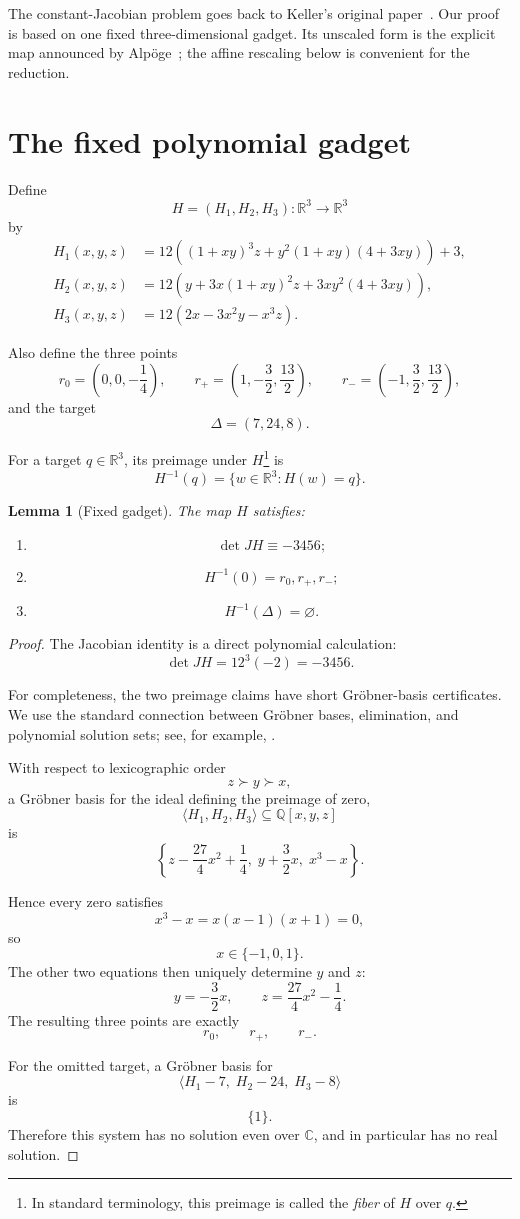 \documentclass[11pt]{article}
\newtheorem{lemma}[theorem]{Lemma}
\newcommand{\R}{\mathbb{R}}
\begin{document}
The constant-Jacobian problem goes back to Keller's original
paper~\cite{Keller1939}.  Our proof is based on one fixed three-dimensional
gadget.  Its unscaled form is the explicit map announced by
Alpöge~\cite{Alpoge2026}; the affine rescaling below is convenient for the
reduction.

\section{The fixed polynomial gadget}

Define
\[
H=(H_1,H_2,H_3):\R^3\longrightarrow\R^3
\]
by
\begin{align}
H_1(x,y,z)
&=
12\left(
(1+xy)^3z
+
y^2(1+xy)(4+3xy)
\right)
+3,
\\
H_2(x,y,z)
&=
12\left(
y
+
3x(1+xy)^2z
+
3xy^2(4+3xy)
\right),
\\
H_3(x,y,z)
&=
12\left(
2x-3x^2y-x^3z
\right).
\end{align}

Also define the three points
\[
r_0=
\left(0,0,-\frac14\right),
\qquad
r_+=
\left(1,-\frac32,\frac{13}{2}\right),
\qquad
r_-=
\left(-1,\frac32,\frac{13}{2}\right),
\]
and the target
\[
\Delta=(7,24,8).
\]

For a target $q\in\R^3$, its preimage under $H$\footnote{In standard
terminology, this preimage is called the \emph{fiber} of $H$ over $q$.} is
\[
H^{-1}(q)=\{w\in\R^3:H(w)=q\}.
\]

\begin{lemma}[Fixed gadget]
The map $H$ satisfies:
\begin{enumerate}
\item
\[
\det JH\equiv -3456;
\]
\item
\[
H^{-1}(0)={r_0,r_+,r_-};
\]
\item
\[
H^{-1}(\Delta)=\varnothing.
\]
\end{enumerate}
\end{lemma}

\begin{proof}
The Jacobian identity is a direct polynomial calculation:
\[
\det JH=12^3(-2)=-3456.
\]

For completeness, the two preimage claims have short Gröbner-basis
certificates.  We use the standard connection between Gröbner bases,
elimination, and polynomial solution sets; see, for example,
\cite[Chs.~2--4]{CLO2025}.

With respect to lexicographic order
\[
z\succ y\succ x,
\]
a Gröbner basis for the ideal defining the preimage of zero,
\[
\langle H_1,H_2,H_3\rangle
\subseteq \mathbb{Q}[x,y,z]
\]
is
\[
\left\{
z-\frac{27}{4}x^2+\frac14,\;
y+\frac32x,\;
x^3-x
\right\}.
\]

Hence every zero satisfies
\[
x^3-x=x(x-1)(x+1)=0,
\]
so
\[
x\in\{-1,0,1\}.
\]
The other two equations then uniquely determine $y$ and $z$:
\[
y=-\frac32x,
\qquad
z=\frac{27}{4}x^2-\frac14.
\]
The resulting three points are exactly
\[
r_0,\qquad r_+,\qquad r_-.
\]

For the omitted target, a Gröbner basis for
\[
\langle
H_1-7,\;
H_2-24,\;
H_3-8
\rangle
\]
is
\[
\{1\}.
\]
Therefore this system has no solution even over $\mathbb{C}$, and in
particular has no real solution.
\end{proof}
\end{document}
